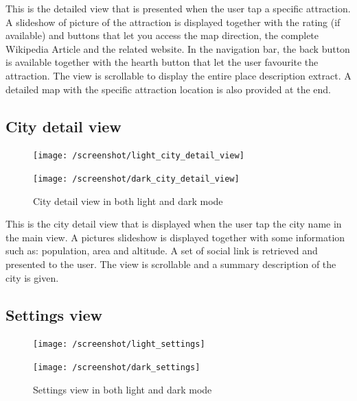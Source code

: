 \documentclass[a4paper, 11pt, parskip=half]{scrreprt}
\theoremstyle{definition}
\begin{document}
This is the detailed view that is presented when the user tap a specific attraction. A slideshow of picture of the attraction is displayed together with the rating (if available) and buttons that let you access the map direction, the complete Wikipedia Article and the related website.
In the navigation bar, the back button is available together with the hearth button that let the user favourite the attraction. The view is scrollable to display the entire place description extract. A detailed map with the specific attraction location is also provided at the end. 

\subsection{City detail view}
\begin{figure}[H]
	\centering
	\begin{minipage}{.5\textwidth}
  	\centering
  	\texttt{[image: /screenshot/light\_city\_detail\_view]}
  	\label{fig:test1}
	\end{minipage}%
	\begin{minipage}{.5\textwidth}
  	\centering
  	\texttt{[image: /screenshot/dark\_city\_detail\_view]}
  	\label{fig:test2}
	\end{minipage}
	\caption{City detail view in both light and dark mode}
\end{figure}

This is the city detail view that is displayed when the user tap the city name in the main view. A pictures slideshow is displayed together with some information such as: population, area and altitude. A set of social link is retrieved and presented to the user. The view is scrollable and a summary description of the city is given.


\subsection{Settings view}
\begin{figure}[H]
	\centering
	\begin{minipage}{.5\textwidth}
  	\centering
  	\texttt{[image: /screenshot/light\_settings]}
  	\label{fig:test1}
	\end{minipage}%
	\begin{minipage}{.5\textwidth}
  	\centering
  	\texttt{[image: /screenshot/dark\_settings]}
  	\label{fig:test2}
	\end{minipage}
	\caption{Settings view in both light and dark mode}
\end{figure}
\end{document}
